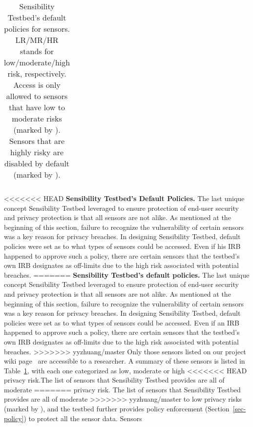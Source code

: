 {\begin{table}
\begin{tabular}{|l|c|c|c|}
\end{tabular}
\egroup

\caption{\small Sensibility Testbed's default policies for sensors. LR/MR/HR
stands for low/moderate/high risk, respectively. Access is only allowed to sensors that have low to 
moderate risks (marked by \tickmark). Sensors that are highly risky are 
disabled by default (marked by \xmark).}
\label{tab:default}
\end{table}

<<<<<<< HEAD
\textbf{Sensibility Testbed's Default Policies.} %
The last unique concept Sensibility Testbed leveraged to  ensure protection of end-user security and privacy protection is that all sensors are not alike. As mentioned at the beginning of this section, failure to recognize the vulnerability of certain sensors was a key reason for privacy breaches. In designing Sensibility Testbed, default policies were set as to what types of sensors could be accessed. Even if his IRB happened to approve such a policy, there are certain sensors that the testbed's
own IRB designates as off-limits due to the high risk associated with potential breaches. 
=======
\textbf{Sensibility Testbed's default policies.} %
The last unique concept Sensibility Testbed leveraged to ensure 
protection of end-user security and privacy protection is that all sensors 
are not alike. As mentioned at the beginning of this section, failure to 
recognize the vulnerability of certain sensors was a key reason for privacy 
breaches. In designing Sensibility Testbed, default policies were set as 
to what types of sensors could be accessed. Even if an IRB happened 
to approve such a policy, there are certain sensors that the testbed's
own IRB designates as off-limits due to the high risk associated with 
potential breaches. 
>>>>>>> yyzhuang/master
Only those sensors listed on our project 
wiki page~\cite{sensor-api} are accessible to a researcher. 
A summary of these sensors is listed in Table~\ref{tab:default}, 
with each one categorized as low, moderate or high 
<<<<<<< HEAD
privacy risk.The list of sensors that Sensibility Testbed provides are all of moderate 
=======
privacy risk. The list of sensors that Sensibility Testbed provides are all of moderate 
>>>>>>> yyzhuang/master
to low privacy risks (marked by \tickmark), and the testbed further provides policy enforcement
(Section~\ref{sec-policy}) to protect all the sensor data. Sensors 
}

